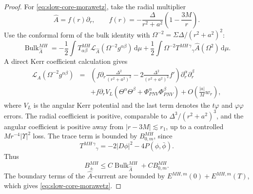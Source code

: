 \documentclass[10pt,a4paper]{amsart}
\newcommand{\dd}{\mathrm{d}}
\begin{document}
\begin{proof}
For \eqref{eq:slow-core-morawetz}, take the radial multiplier
\begin{equation}
 \widehat A=f(r)\partial_r,
 \qquad
 f(r)=-\frac{\Delta}{r^2+a^2}\left(1-\frac{3M}{r}\right).
\end{equation}
Use the conformal form of the bulk identity with \(\Omega^{-2}=\Sigma\Delta/(r^2+a^2)^2\):
\begin{equation}
\operatorname{Bulk}_{\widehat A}^{MH}
=-\frac12\int T^{MH}_{\alpha\beta}\mathcal L_{\widehat A}(\Omega^{-2}g^{\alpha\beta})\,\dd\mu
+\frac12\int \Omega^{-2}T^{MH\,\gamma}{}_{\gamma}\widehat A(\Omega^2)\,\dd\mu.
\end{equation}
A direct Kerr coefficient calculation gives
\begin{eqnarray}
\mathcal L_{\widehat A}(\Omega^{-2}g^{\alpha\beta})
&=&
\left(f\partial_r\frac{\Delta^2}{(r^2+a^2)^2}
 -2\frac{\Delta^2}{(r^2+a^2)^2}f'\right)\partial_r^\alpha\partial_r^\beta
\nonumber\\
&&
+f\partial_rV_L(\Theta^\alpha\Theta^\beta+\Phi_{PNV}^\alpha\Phi_{PNV}^\beta)
+O\left(\frac{|a|}{M}w_r\right),
\end{eqnarray}
where \(V_L\) is the angular Kerr potential and the last term denotes the \(t\varphi\) and \(\varphi\varphi\) errors.  The radial coefficient is positive, comparable to \(\Delta^3/(r^2+a^2)^3\), and the angular coefficient is positive away from \(|r-3M|\lesssim r_1\), up to a controlled \(Mr^{-4}|\Upsilon|^2\) loss.  The trace term is bounded by \(B_{0,m}^{MH}\), since
\begin{equation}
 T^{MH\,\gamma}{}_{\gamma}=-2|D\phi|^2-4P(\phi,\bar\phi).
\end{equation}
Thus
\begin{equation}
 B_{\pm}^{MH}\le C\operatorname{Bulk}_{\widehat A}^{MH}+C B_{0,m}^{MH}.
\end{equation}
The boundary terms of the \(\widehat A\)-current are bounded by \(E^{MH,m}(0)+E^{MH,m}(T)\), which gives \eqref{eq:slow-core-morawetz}.


\end{proof}
\end{document}
